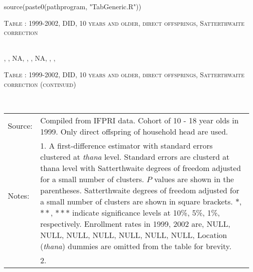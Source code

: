 \begin{Schunk}
\begin{Sinput}
source(paste0(pathprogram, "TabGeneric.R"))
\end{Sinput}
\end{Schunk}
\begin{table}\hfil\textsc{\footnotesize Table \thetable: 1999-2002, DID, 10 years and older, direct offsprings, Satterthwaite correction\label{zEm.1999.10.sameN}}\\\setlength{\tabcolsep}{1pt}\renewcommand{\arraystretch}{.675}\hspace{-2em}\hfil{}\\\renewcommand{\arraystretch}{1}, , NA, , , NA, , ,     \end{table}

\clearpage
\begin{table}\hfil\textsc{\footnotesize Table \thetable: 1999-2002, DID, 10 years and older, direct offsprings, Satterthwaite correction (continued)\label{zEm.1999.10.sameN}}\\\setlength{\tabcolsep}{1pt}\renewcommand{\arraystretch}{.675}\hspace{-2em}\hfil{}\\\renewcommand{\arraystretch}{1}\hfil\begin{tabular}{>{\hfill\scriptsize}p{1cm}<{}>{\scriptsize}p{12cm}<{\hfill}} Source:& Compiled from IFPRI data. Cohort of 10 - 18 year olds in 1999. Only direct offspring of household head are used.\\[-1ex] Notes:& 1. A first-difference estimator with standard errors clustered at \textit{thana} level. Standard errors are clusterd at thana level with Satterthwaite degrees of freedom adjusted for a small number of clusters. $P$ values are shown in the parentheses. Satterthwaite degrees of freedom adjusted for a small number of clusters are shown in square brackets. $*$, $**$, $***$ indicate significance levels at 10\%, 5\%, 1\%, respectively. Enrollment rates in 1999, 2002 are, NULL, NULL, NULL, NULL, NULL, NULL, NULL, Location (\textit{thana}) dummies are omitted from the table for brevity. \\ & 2.   \end{tabular} \end{table}



